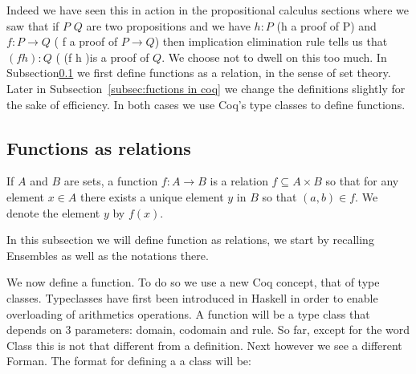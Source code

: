  Indeed we have seen this in action in the propositional calculus sections where we saw that if $P$ $Q$   are two propositions and we have $h:P$ (h a proof of P) and $f:P\rightarrow Q$ ( f a proof of $P\rightarrow Q$) then implication elimination rule tells us that $(f h):Q$ ( (f h )is a proof of $Q$. 
 We choose not to dwell on this too much. In Subsection\ref{subsec:fuctions as relation} we first define functions as a relation, in the sense of set theory. Later in Subsection~\ref{subsec:fuctions in coq} we change the definitions  slightly for the sake of efficiency. In both cases we use Coq's type classes to define functions. 
 
 \subsection{Functions as relations}\label{subsec:fuctions as relation}
 
 \begin{definition}
 If $A$ and $B$  are sets, a function $f:A \rightarrow B$ is a relation $f\subseteq A\times B$ so that for any element $x\in A$ there exists a unique element $y$ in $B$ so that $ (a, b) \in f$. We denote the element $y$ by $f(x)$.
 \end{definition}
 
 
In this subsection we will define function as relations, we start by recalling Ensembles as well as the notations there.
 
 


We now define a function. To do so we use a new Coq concept, that of type classes. Typeclasses have first been introduced in Haskell in order to enable overloading of arithmetics operations. A function will be a type class that depends on 3 parameters: domain, codomain and rule. So far, except for the word Class  this is not that different from a definition. Next however we see a different Forman. The format for defining a a class will be:

